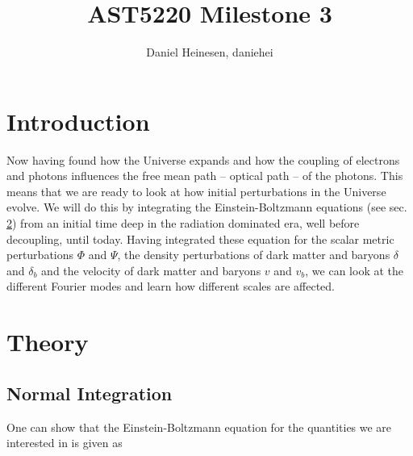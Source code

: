 \documentclass[a4paper,norsk, 10pt]{article}
\title{AST5220 Milestone 3}
\author{Daniel Heinesen, daniehei}
\begin{document}
\maketitle

\section{Introduction}
Now having found  how the Universe expands and how the coupling of electrons and photons influences the free mean path -- optical path -- of the photons. This means that we are ready to look at how initial perturbations in the Universe evolve. We will do this by integrating the Einstein-Boltzmann equations (see sec. \ref{sec:theory}) from an initial time deep in the radiation dominated era, well before decoupling, until today. Having integrated these equation for the scalar metric perturbations $\Phi$ and $\Psi$, the density perturbations of dark matter and baryons $\delta$ and $\delta_b$ and the velocity of dark matter and baryons $v$ and $v_b$, we can look at the different Fourier modes and learn how different scales are affected.

\section{Theory}\label{sec:theory}

\subsection{Normal Integration}\label{sec:normal}
One can show that the Einstein-Boltzmann equation for the quantities we are interested in is given as
\end{document}
